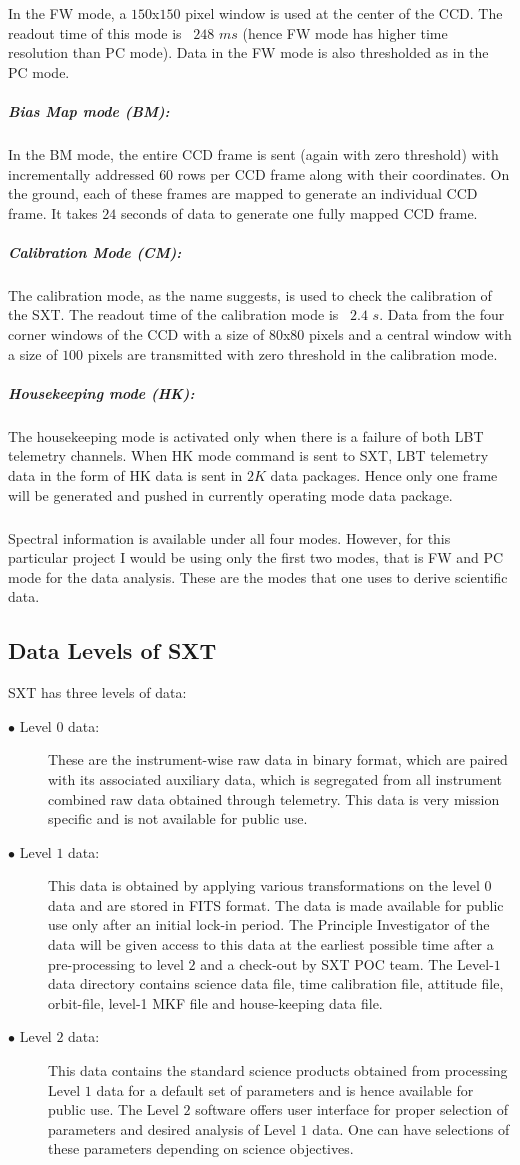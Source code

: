 \documentclass[a4paper,twoside]{report}
\numberwithin{equation}{section}
\begin{document}
In the FW mode, a $150$x$150$ pixel window is used at the center of the CCD. The readout time of this mode is ~$248$ $ms$ (hence FW mode has higher time resolution than PC mode). Data in the FW mode is also thresholded as in the PC mode. 
\subparagraph{Bias Map mode (BM):}
In the BM mode, the entire CCD frame is sent (again with zero threshold) with incrementally addressed $60$ rows per CCD frame along with their coordinates. On the ground, each of these frames are mapped to generate an individual CCD frame. It takes $24$ seconds of data to generate one fully mapped CCD frame.
\subparagraph{Calibration Mode (CM):}
The calibration mode, as the name suggests, is used to check the calibration of the SXT. The readout time of the calibration mode is ~$2.4$ $s$. Data from the four corner windows of the CCD with a size of $80$x$80$ pixels and a central window with a size of $100$ pixels are transmitted with zero threshold in the calibration mode. 
\subparagraph{Housekeeping mode (HK):}
The housekeeping mode is activated only when there is a failure of both LBT telemetry channels. When HK mode command is sent to SXT, LBT telemetry data in the form of HK data is sent in $2K$ data packages. Hence only one frame will be generated and pushed in currently operating mode data package. 
\subparagraph{}
Spectral information is available under all four modes. However, for this particular project I would be using only the first two modes, that is FW and PC mode for the data analysis. These are the modes that one uses to derive scientific data.  
\subsection{Data Levels of SXT}
SXT has three levels of data:
\begin{description}
\item[$\bullet$ Level $0$ data:]
These are the instrument-wise raw data in binary format, which are paired with its associated auxiliary data, which is segregated from all instrument combined raw data obtained through telemetry. This data is very mission specific and is not available for public use.
\item[$\bullet$ Level $1$ data:]
This data is obtained by applying various transformations on the level $0$ data and are stored in FITS format. The data is made available for public use only after an initial lock-in period. The Principle Investigator of the data will be given access to this data at the earliest possible time after a pre-processing to level $2$ and a check-out by SXT POC team. The Level-$1$ data directory contains science data file, time calibration file, attitude file, orbit-file, level-1 MKF file and house-keeping data file.
\item[$\bullet$ Level $2$ data:]
This data contains the standard science products obtained from processing Level $1$ data for a default set of parameters and is hence available for public use. The Level $2$ software offers user interface for proper selection of parameters and desired analysis of Level $1$ data. One can have selections of these parameters depending on  science objectives. 
\end{description}
\end{document}
